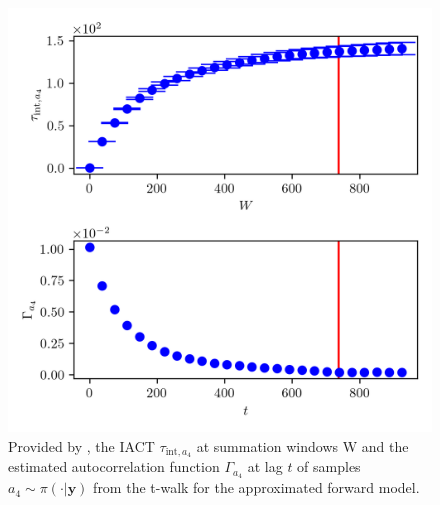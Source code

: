 \begin{figure}[ht!]
	\centering
	\includegraphics{UwerrTauIntTWalk13.png}
	\caption[IACT and autocorrelation function of samples $a_4 \sim \pi(\cdot|\bm{y})$, for approximated model.]{Provided by \cite{drikHesse}, the IACT $\tau_{\text{int},a_4}$ at summation windows W and the estimated autocorrelation function $\Gamma_{a_4}$ at lag $t$ of samples $a_4 \sim \pi( \cdot| \bm{y})$ from the t-walk for the approximated forward model.}
	\label{fig:TWalkIATC14}
\end{figure}
